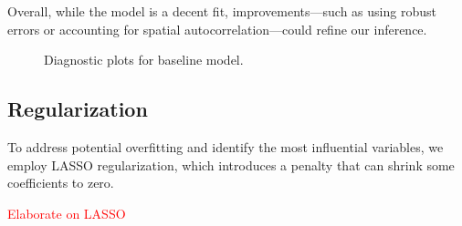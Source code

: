 \documentclass[
]{article}
\begin{document}
Overall, while the model is a decent fit, improvements---such as using robust errors or accounting for spatial autocorrelation---could refine our inference.

\begin{figure}
\caption{Diagnostic plots for baseline model.}\label{fig:diagnostics}
\end{figure}

\subsection{Regularization}\label{regularization}

To address potential overfitting and identify the most influential variables, we employ LASSO regularization, which introduces a penalty that can shrink some coefficients to zero.

\textcolor{red}{Elaborate on LASSO}

 
  \providecommand{\huxb}[2]{\arrayrulecolor[RGB]{#1}\global\arrayrulewidth=#2pt}
  \providecommand{\huxvb}[2]{\color[RGB]{#1}\vrule width #2pt}
  \providecommand{\huxtpad}[1]{\rule{0pt}{#1}}
  \providecommand{\huxbpad}[1]{\rule[-#1]{0pt}{#1}}
\end{document}
